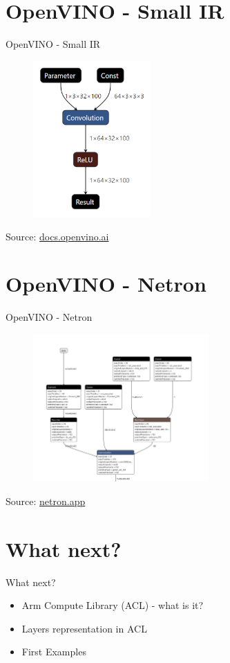 \documentclass{beamer}
\begin{document}
\section{OpenVINO - Small IR}
\begin{frame}{OpenVINO - Small IR}
  \begin{figure}[h]
    \includegraphics[width=0.4\textwidth]{images/small_ir.png}
  \end{figure}
  \footnotesize Source: \href{https://docs.openvino.ai/}{docs.openvino.ai}
\end{frame}

\section{OpenVINO - Netron}
\begin{frame}{OpenVINO - Netron}
  \begin{figure}[h]
    \includegraphics[width=0.6\textwidth]{images/openvino.png}
  \end{figure}
  \footnotesize Source: \href{https://netron.app/}{netron.app}
\end{frame}

\section{What next?}
\begin{frame}{What next?}
  \begin{itemize}
    \item Arm Compute Library (ACL) - what is it?
    \item Layers representation in ACL
    \item First Examples
  \end{itemize}
\end{frame}
\end{document}
